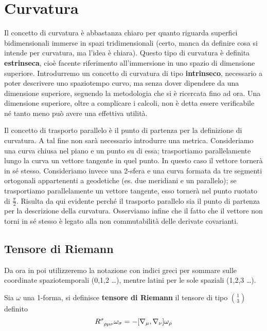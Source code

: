 \chapter{Curvatura}
Il concetto di curvatura è abbastanza chiaro per quanto riguarda superfici bidimensionali immerse in spazi tridimensionali (certo, manca da definire cosa si intende per curvatura, ma l'idea è chiara). Questo tipo di curvatura è definita \textbf{estrinseca}, cioè facente riferimento all'immersione in uno spazio di dimensione superiore. Introdurremo un concetto di curvatura di tipo \textbf{intrinseco}, necessario a poter descrivere uno spaziotempo curvo, ma senza dover dipendere da una dimensione superiore, seguendo la metodologia che si è ricercata fino ad ora. Una dimensione superiore, oltre a complicare i calcoli, non è detta essere verificabile né tanto meno può avere una effettiva utilità.

Il concetto di trasporto parallelo è il punto di partenza per la definizione di curvatura. A tal fine non sarà necessario introdurre una metrica. 
Consideriamo una curva chiusa nel piano e un punto su di essa; trasportiamo parallelamente lungo la curva un vettore tangente in quel punto. In questo caso il vettore tornerà in sé stesso. Consideriamo invece una 2-sfera e una curva formata da tre segmenti ortogonali appartenenti a geodetiche (es. due meridiani e un parallelo); se trasportiamo parallelamente un vettore tangente, esso tornerà nel punto ruotato di $\frac{\pi}{2}$. Risulta da qui evidente perché il trasporto parallelo sia il punto di partenza per la descrizione della curvatura.
Osserviamo infine che il fatto che il vettore non torni in sé stesso è legato alla non commutabilità delle derivate covarianti.

\section{Tensore di Riemann}
Da ora in poi utilizzeremo la notazione con indici greci per sommare sulle coordinate spaziotemporali (0,1,2 \dots ), mentre latini per le sole spaziali (1,2,3 \dots).
\begin{definizione}
Sia $\omega$ una 1-forma, si definisce \textbf{tensore di Riemann} il tensore di tipo $\binom{1}{3}$ definito
\begin{equation*}
    \tensor{R}{^\sigma_{\rho\mu\nu}} \omega_\sigma = - [\nabla_\mu, \nabla_\nu]\omega_\rho
\end{equation*}
\end{definizione}

